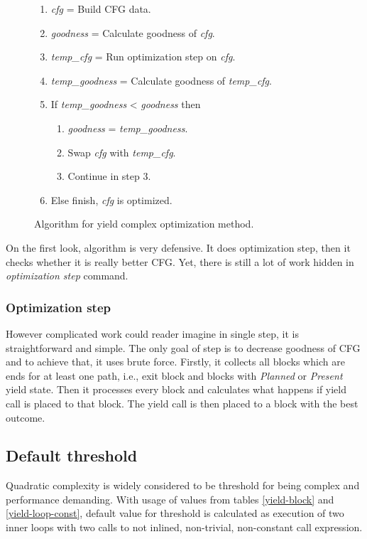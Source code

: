 \begin{figure}[h!]
\caption{Algorithm for yield complex optimization method.}
\begin{enumerate}
\item{\emph{cfg} = Build CFG data.}
\item{\emph{goodness} = Calculate goodness of \emph{cfg}.}
\item{\emph{temp\_cfg} = Run optimization step on \emph{cfg}.}
\item{\emph{temp\_goodness} = Calculate goodness of \emph{temp\_cfg}.}
\item{If \emph{temp\_goodness} < \emph{goodness} then}
	\begin{enumerate}[label=5.\arabic*.]
	\item{\emph{goodness} = \emph{temp\_goodness}.}
	\item{Swap \emph{cfg} with \emph{temp\_cfg}.}
	\item{Continue in step 3.}
	\end{enumerate}
\item{Else finish, \emph{cfg} is optimized.}
\end{enumerate}
\end{figure}

On the first look, algorithm is very defensive. It does optimization step, then it checks whether it is really better CFG. Yet, there is still a lot of work hidden in \emph{optimization step} command.

\subsubsection{Optimization step}
However complicated work could reader imagine in single step, it is straightforward and simple. The only goal of step is to decrease goodness of CFG and to achieve that, it uses brute force. Firstly, it collects all blocks which are ends for at least one path, i.e., exit block and blocks with \emph{Planned} or \emph{Present} yield state. Then it processes every block and calculates what happens if yield call is placed to that block. The yield call is then placed to a block with the best outcome.

\subsection{Default threshold}
Quadratic complexity is widely considered to be threshold for being complex and performance demanding. With usage of values from tables \ref{yield-block} and \ref{yield-loop-const}, default value for threshold is calculated as execution of two inner  loops with two calls to not inlined, non-trivial, non-constant call expression.

